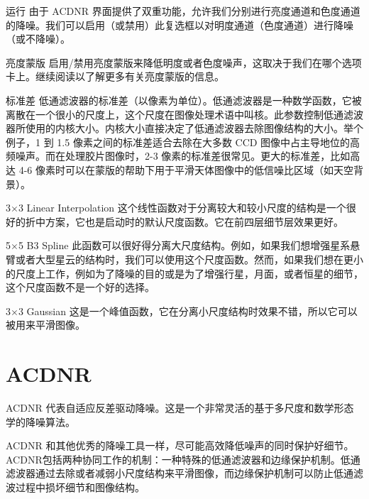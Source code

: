 \begin{nounexplanation}
  \item[运行\translate{Apply}] 由于 ACDNR 界面提供了双重功能，允许我们分别进行亮度通道和色度通道的降噪。我们可以启用（或禁用）此复选框以对明度通道（色度通道）进行降噪（或不降噪）。

  \item[亮度蒙版\translate{Lightness mask}] 启用/禁用亮度蒙版来降低明度或者色度噪声，这取决于我们在哪个选项卡上。继续阅读以了解更多有关亮度蒙版的信息。
  
  \item[标准差\translate{Std.Dev.}] 低通滤波器的标准差（以像素为单位）。低通滤波器是一种数学函数，它被离散在一个很小的尺度上，这个尺度在图像处理术语中叫核。此参数控制低通滤波器所使用的内核大小。内核大小直接决定了低通滤波器去除图像结构的大小。举个例子，1 到 1.5 像素之间的标准差适合去除在大多数 CCD 图像中占主导地位的高频噪声。而在处理胶片图像时，2-3 像素的标准差很常见。更大的标准差，比如高达 4-6 像素时可以在蒙版的帮助下用于平滑天体图像中的低信噪比区域（如天空背景）。
    \begin{nounexplanation}
      \item[3$\times$3 Linear Interpolation] 这个线性函数对于分离较大和较小尺度的结构是一个很好的折中方案，它也是启动时的默认尺度函数。它在前四层细节层效果更好。
      \item[5$\times$5 B3 Spline] 此函数可以很好得分离大尺度结构。例如，如果我们想增强星系悬臂或者大型星云的结构时，我们可以使用这个尺度函数。然而，如果我们想在更小的尺度上工作，例如为了降噪的目的或是为了增强行星，月面，或者恒星的细节，这个尺度函数不是一个好的选择。
      \item[3$\times$3 Gaussian] 这是一个峰值函数，它在分离小尺度结构时效果不错，所以它可以被用来平滑图像。
    \end{nounexplanation}
\end{nounexplanation}


\section{ACDNR}

ACDNR 代表自适应反差驱动降噪。这是一个非常灵活的基于多尺度和数学形态学的降噪算法。

ACDNR 和其他优秀的降噪工具一样，尽可能高效降低噪声的同时保护好细节。ACDNR包括两种协同工作的机制：一种特殊的低通滤波器和边缘保护机制。低通滤波器通过去除或者减弱小尺度结构来平滑图像，而边缘保护机制可以防止低通滤波过程中损坏细节和图像结构。

